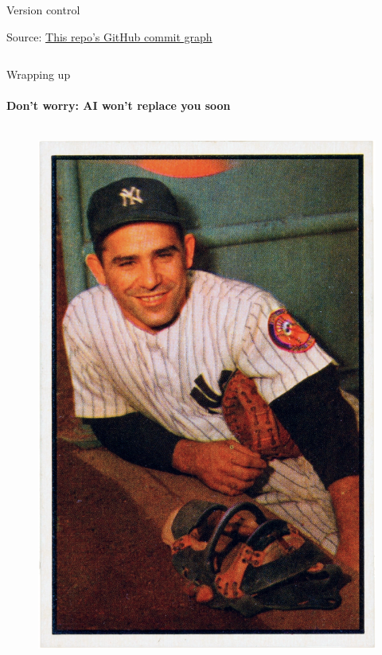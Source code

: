 \begin{frame}
\begin{columns}[T]
\begin{column}{0.48\textwidth}
\begin{block}{Version control}
\begin{figure}[ht]
                \end{figure}
                Source: \href{https://github.com/munichpavel/risk-ai-workshop/network}{This repo's GitHub commit graph}
            \end{block}
        \end{column}
    \end{columns}
\end{frame}

\begin{frame}{Wrapping up}
    \framesubtitle{Don't worry: AI won't replace you soon}
    \begin{columns}[T] %
        \begin{column}{.40\textwidth}
            \begin{figure}[ht]
                \includegraphics[height=0.4\textheight]{graphics/1953_Bowman_Yogi_Berra}

\end{figure}
\end{column}
\end{columns}
\end{frame}
